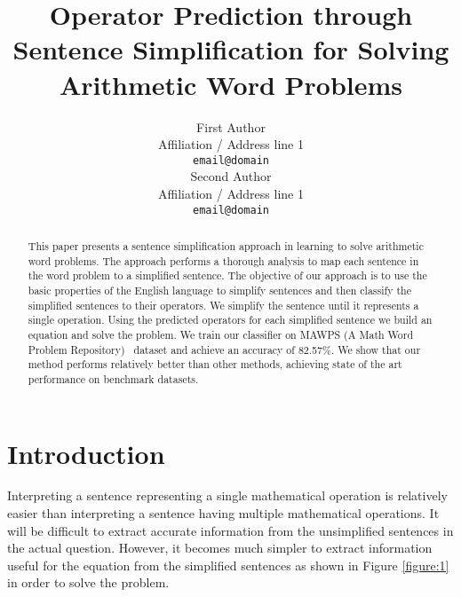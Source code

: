 \documentclass[11pt]{article}
\begin{document}
\title{Operator Prediction through Sentence Simplification for Solving Arithmetic Word Problems}

\author{First Author \\
  Affiliation / Address line 1 \\
  {\tt email@domain} \\\And
  Second Author \\
  Affiliation / Address line 1 \\
  {\tt email@domain} \\}

\date{}
\maketitle

\begin{abstract}
This paper presents a sentence simplification approach in learning to solve arithmetic word problems. The approach performs a thorough analysis to map each sentence in the word problem to a simplified sentence. The objective of our approach is to use the basic properties of the English language to simplify sentences and then classify the simplified sentences to their operators. We simplify the sentence until it represents a single operation. Using the predicted operators for each simplified sentence we build an equation and solve the problem. We train our classifier on MAWPS (A Math Word Problem Repository)~\cite{MAWPS} dataset and achieve an accuracy of 82.57\%. We show that our method performs relatively better than other methods, achieving state of the art performance on benchmark datasets.
\end{abstract}

\section{Introduction}
Interpreting a sentence representing a single mathematical operation is relatively easier than interpreting a sentence having multiple mathematical operations. It will be difficult to extract accurate information from the unsimplified sentences in the actual question. However, it becomes much simpler to extract information useful for the equation from the simplified sentences as shown in Figure \ref{figure:1} in order to solve the problem.
\end{document}
